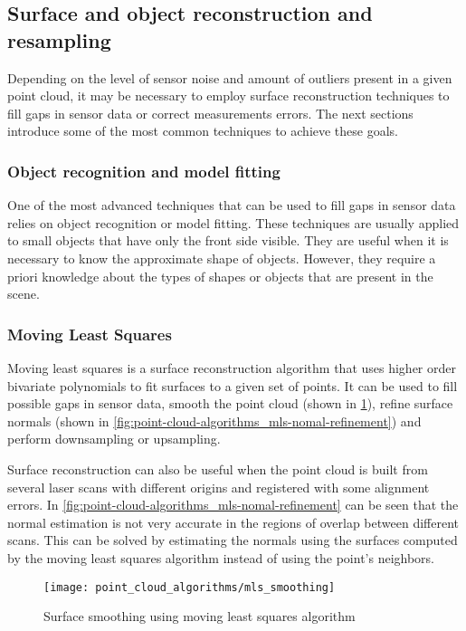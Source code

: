\subsection{Surface and object reconstruction and resampling}

Depending on the level of sensor noise and amount of outliers present in a given point cloud, it may be necessary to employ surface reconstruction techniques to fill gaps in sensor data or correct measurements errors. The next sections introduce some of the most common techniques to achieve these goals.


\subsubsection{Object recognition and model fitting}

One of the most advanced techniques that can be used to fill gaps in sensor data relies on object recognition or model fitting. These techniques are usually applied to small objects that have only the front side visible. They are useful when it is necessary to know the approximate shape of objects. However, they require a priori knowledge about the types of shapes or objects that are present in the scene.


\subsubsection{Moving Least Squares}\label{sec:point-cloud-algorithms_mls}

Moving least squares \cite{Alexa2003} is a surface reconstruction algorithm that uses higher order bivariate polynomials to fit surfaces to a given set of points. It can be used to fill possible gaps in sensor data, smooth the point cloud (shown in \cref{fig:point-cloud-algorithms_mls-smoothing}), refine surface normals (shown in \cref{fig:point-cloud-algorithms_mls-nomal-refinement}) and perform downsampling or upsampling.

Surface reconstruction can also be useful when the point cloud is built from several laser scans with different origins and registered with some alignment errors. In \cref{fig:point-cloud-algorithms_mls-nomal-refinement} can be seen that the normal estimation is not very accurate in the regions of overlap between different scans. This can be solved by estimating the normals using the surfaces computed by the moving least squares algorithm instead of using the point's neighbors.


\begin{figure}[H]
	\centering
	\texttt{[image: point\_cloud\_algorithms/mls\_smoothing]}
	\caption{Surface smoothing using moving least squares algorithm\protect\footnotemark}
	\label{fig:point-cloud-algorithms_mls-smoothing}
\end{figure}

